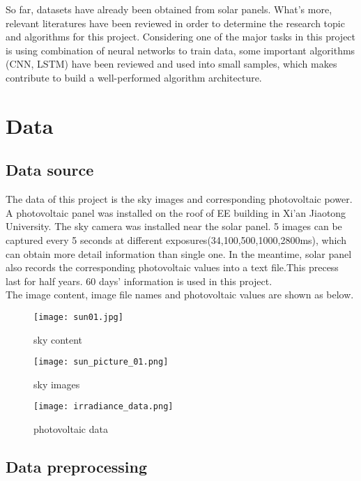 \documentclass{elegantpaper}
\begin{document}
So far, datasets have already been obtained from solar panels. What's more, relevant literatures have been reviewed in order to determine the research topic and algorithms for this project.
 Considering one of the major tasks in this project is using  combination of neural networks to train data, some important algorithms (CNN, LSTM) have been reviewed and used into small samples, which makes contribute to build a well-performed algorithm architecture.\\[2ex]



\section{Data}
\subsection{Data source}
The data of this project is the sky images and corresponding photovoltaic power.
A photovoltaic panel was installed on the roof of EE building in Xi'an Jiaotong University. The sky camera was installed near the solar panel. 5 images can be captured every 5 seconds at different exposures({34,100,500,1000,2800}ms), which can obtain more detail information than single one. In the meantime, solar panel also records the corresponding photovoltaic values into a text file.This precess last for half years. 60 days' information is used in this project.\\[2ex]

The image content, image file names and photovoltaic values are shown as below.

\begin{figure}[!ht]
	\centering
	\texttt{[image: sun01.jpg]}
	\caption{sky content\label{fig:sun}}
\end{figure}

\begin{figure}[!ht]
	\centering
	\texttt{[image: sun\_picture\_01.png]}
	\caption{sky images\label{fig:image file names}}
\end{figure}

\begin{figure}[!ht]
	\centering
	\texttt{[image: irradiance\_data.png]}
	\caption{photovoltaic data\label{fig:photovoltaic}}
\end{figure}


 
\subsection{Data preprocessing}
\end{document}
